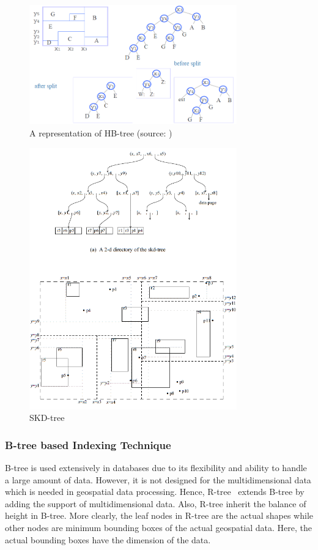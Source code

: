 \documentclass[a4paper,12pt]{article}
\begin{document}
\begin{figure}
\centering
\includegraphics[width=0.8\textwidth]{hbtree}
\caption{A representation of HB-tree (source: \cite{hbtree1})}
\label{fighbtree}
\end{figure}

\begin{figure}
\centering
\includegraphics[width=0.8\textwidth]{skdtree}
\caption{SKD-tree}
\label{figskdtree}
\end{figure}

\subsubsection{B-tree based Indexing Technique}
B-tree is used extensively in databases due to its flexibility and ability to handle a large amount of data.
However, it is not designed for the multidimensional data which is needed in geospatial data processing.
Hence, R-tree~\cite{rtree} extends B-tree by adding the support of multidimensional data. 
Also, R-tree inherit the balance of height in B-tree.
More clearly, the leaf nodes in R-tree are the actual shapes while
other nodes are minimum bounding boxes of the actual geospatial data. Here, 
the actual bounding boxes have the dimension of the data.
\end{document}
